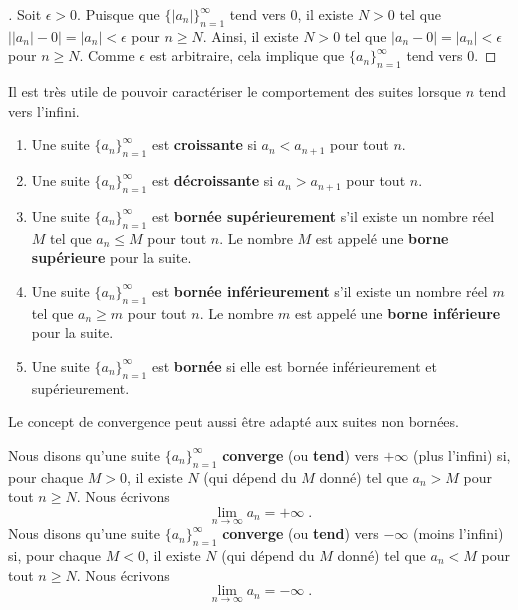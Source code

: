 {\begin{proof}[\theory]
\subQ{$\Leftarrow$} Soit $\epsilon>0$. Puisque que
$\displaystyle \{ |a_n|\}_{n=1}^\infty$ tend vers $0$, il existe $N>0$
tel que $\big| |a_n|- 0 \big| = |a_n| <\epsilon$ pour $n\geq N$.
Ainsi, il existe $N>0$ tel que $|a_n- 0| = |a_n| <\epsilon$ pour
$n\geq N$.  Comme $\epsilon$ est arbitraire, cela implique que
$\displaystyle \{a_n\}_{n=1}^\infty$ tend vers $0$.
\end{proof}

Il est très utile de pouvoir caractériser le comportement des suites
lorsque $n$ tend vers l'infini.

\begin{focus}{\dfn}
\begin{enumerate}
\item Une suite $\{a_n\}_{n=1}^\infty$ est {\bfseries croissante}
 si $a_n < a_{n+1}$ pour tout $n$.
\item Une suite $\{a_n\}_{n=1}^\infty$ est {\bfseries décroissante}
 si $a_n > a_{n+1}$ pour tout $n$.
\item Une suite $\{a_n\}_{n=1}^\infty$ est
{\bfseries bornée supérieurement}
s'il existe un nombre réel $M$ tel que $a_n \leq M$ pour tout $n$.  Le
nombre $M$ est appelé une {\bfseries borne supérieure} pour la suite.
\item Une suite $\{a_n\}_{n=1}^\infty$ est
{\bfseries bornée inférieurement}
s'il existe un nombre réel $m$ tel que $a_n \geq m$ pour tout $n$.  Le
nombre $m$ est appelé une {\bfseries borne inférieure} pour la suite.
\item Une suite $\{a_n\}_{n=1}^\infty$ est
{\bfseries bornée} si elle est bornée
inférieurement et supérieurement.
\end{enumerate}
\end{focus}

Le concept de convergence peut aussi être adapté aux suites non bornées.

\begin{focus}[\theory]{\dfn}
Nous disons qu'une suite $\displaystyle \{ a_n\}_{n=1}^\infty$
{\bfseries converge} (ou {\bfseries tend}) vers $+\infty$ (plus
l'infini) si, pour chaque $M>0$, il existe $N$ (qui dépend du $M$ donné)
tel que $a_n > M$ pour tout $n \geq N$.  Nous écrivons
\[
\lim_{n\rightarrow \infty} a_n = +\infty \; .
\]
Nous disons qu'une suite $\displaystyle \{ a_n\}_{n=1}^\infty$
{\bfseries converge} (ou {\bfseries tend}) vers $-\infty$ (moins
l'infini) si, pour chaque $M<0$, il existe $N$ (qui dépend du $M$ donné)
tel que $a_n < M$ pour tout $n \geq N$.  Nous écrivons
\[
\lim_{n\rightarrow \infty} a_n = -\infty \; .
\]
\label{def_of_lim_at_inf}
\end{focus}

}
